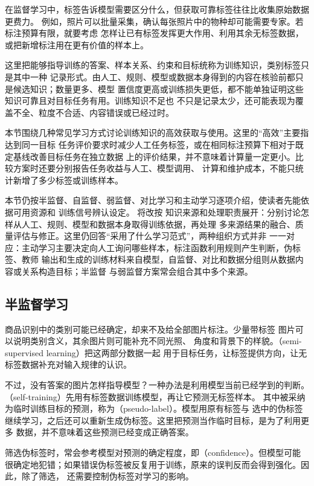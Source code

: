 在监督学习中，标签告诉模型需要区分什么，但获取可靠标签往往比收集原始数据更费力。
例如，照片可以批量采集，确认每张照片中的物种却可能需要专家。若标注预算有限，就要考虑
怎样让已有标签发挥更大作用、利用其余无标签数据，或把新增标注用在更有价值的样本上。

这里把能够指导训练的答案、样本关系、约束和目标统称为训练知识，类别标签只是其中一种
记录形式。由人工、规则、模型或数据本身得到的内容在核验前都只是候选知识；数量更多、模型
置信度更高或训练损失更低，都不能单独证明这些知识可靠且对目标任务有用。训练知识不足也
不只是记录太少，还可能表现为覆盖不全、粒度不合适、内容错误或已经过时。

本节围绕几种常见学习方式讨论训练知识的高效获取与使用。这里的“高效”主要指达到同一目标
任务评价要求时减少人工任务标签，或在相同标注预算下相对于既定基线改善目标任务在独立数据
上的评价结果，并不意味着计算量一定更小。比较方案时还要分别报告任务收益与人工、模型调用、
计算和维护成本，不能只统计新增了多少标签或训练样本。

本节仍按半监督、自监督、弱监督、对比学习和主动学习逐项介绍，使读者先能依据可用资源和
训练信号辨认设定。
将改按
知识来源和处理职责展开：分别讨论怎样从人工、规则、模型和数据本身取得训练依据，再处理
多来源结果的融合、质量评估与修正。这里仍回答“采用了什么学习范式”，两种组织方式并非
一一对应：主动学习主要决定向人工询问哪些样本，标注函数利用规则产生判断，伪标签、教师
输出和生成的训练材料来自模型，自监督、对比和数据分组则从数据内容或关系构造目标；半监督
与弱监督方案常会组合其中多个来源。

\subsection{半监督学习}
\label{sec:semi-supervised-learning}

商品识别中的类别可能已经确定，却来不及给全部图片标注。少量带标签
图片可以说明类别含义，其余图片则可能补充不同光照、
角度和背景下的样貌。（semi-supervised learning）把这两部分数据一起
用于目标任务，让标签提供方向，让无标签数据补充对输入规律的认识。

不过，没有答案的图片怎样指导模型？一种办法是利用模型当前已经学到的判断。
（self-training）先用有标签数据训练模型，再让它预测无标签样本。
其中被采纳为临时训练目标的预测，称为（pseudo-label）。模型用原有标签与
选中的伪标签继续学习，之后还可以重新生成伪标签。这里把预测当作临时目标，是为了利用更多
数据，并不意味着这些预测已经变成正确答案。

筛选伪标签时，常会参考模型对预测的确定程度，即（confidence）。但模型可能
很确定地犯错；如果错误伪标签被反复用于训练，原来的误判反而会得到强化。因此，除了筛选，
还需要控制伪标签对学习的影响。

